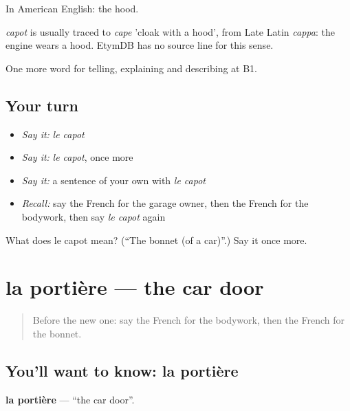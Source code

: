 In American English: the hood.

\begin{cousinweb}
\emph{capot} is usually traced to \emph{cape} 'cloak with a hood', from Late Latin \emph{cappa}: the engine wears a hood. EtymDB has no source line for this sense.
\end{cousinweb}

\begin{grammarlens}[title={What you've built}]
One more word for telling, explaining and describing at B1.
\end{grammarlens}

\subsection*{Your turn}
\begin{itemize}
\raggedright
  \item \emph{Say it:} \emph{le capot}
  \item \emph{Say it:} \emph{le capot}, once more
  \item \emph{Say it:} a sentence of your own with \emph{le capot}
  \item \emph{Recall:} say the French for the garage owner, then the French for the bodywork, then say \emph{le capot} again
\end{itemize}

\begin{tcolorbox}[breakable,colback=teal!4,colframe=teal!35!black,title={Before you move on}]
What does le capot mean? (\textquotedblleft{}The bonnet (of a car)\textquotedblright{}.) Say it once more.
\end{tcolorbox}
\section[la portière]{la portière — the car door}

\label{lesson:FR-C406-portiere}



\begin{quote}
Before the new one: say the French for the bodywork, then the French for the bonnet.
\end{quote}

\subsection*{You'll want to know: la portière}
\textbf{la portière} — \textquotedblleft{}the car door\textquotedblright{}.

